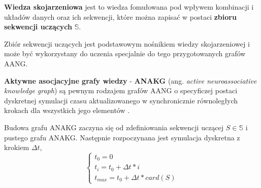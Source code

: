 \begin{definicja}
    \label{def:wiedzaSkoj}
    \textbf{Wiedza skojarzeniowa} jest to wiedza fomułowana pod wpływem kombinacji i układów danych oraz ich sekwencji, które można zapisać w postaci \textbf{zbioru sekwencji uczących}
    $\mathbb{S}$.
\end{definicja}

Zbiór sekwencji uczących jest podstawowym nośnikiem wiedzy skojarzeniowej i może być wykorzystany do uczenia specjalnie do tego przygotowanych grafów AANG.

\begin{definicja}
    \label{def:anakg}
    \textbf{Aktywne asocjacyjne grafy wiedzy} - \textbf{ANAKG} (ang. \emph{active neuroassociative knowledge graph}) są pewnym rodzajem grafów AANG o specyficzej postaci dyskretnej
     symulacji czasu aktualizowanego w synchronicznie równoległych krokach dla wszystkich jego elementów \cite[s. 234]{Horzyk}.
\end{definicja}

Budowa grafu ANAKG zaczyna się od zdefiniowania sekwencji uczącej $S \in \mathbb{S}$ i pustego grafu ANAKG. Następnie rozpoczynana jest symulacja dyskretna z krokiem $\Delta t$, 
\begin{equation}
\begin{cases}
    t_0 = 0 \\
    t_i = t_0 + \Delta t * i \\
    t_{max} = t_0 + \Delta t * card(S)
\end{cases}
\end{equation}

 


